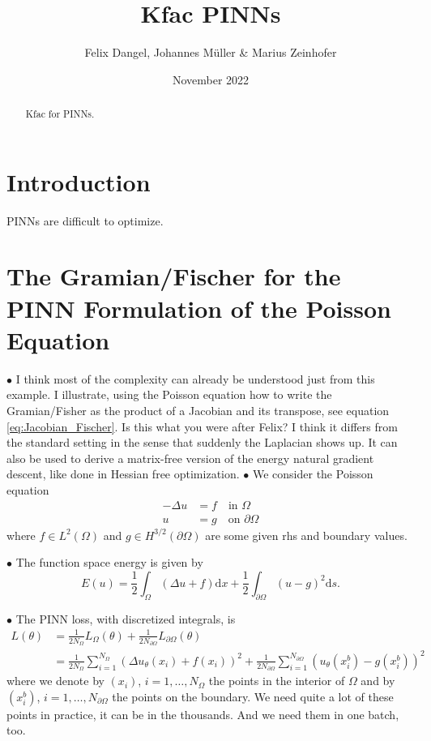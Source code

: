 \documentclass[11pt]{article}
\title{Kfac PINNs }
\date{November 2022}
\author{Felix Dangel, Johannes M\"uller \& Marius Zeinhofer}
\theoremstyle{definition}
\theoremstyle{plain}
\begin{document}
\maketitle

\begin{abstract}
  Kfac for PINNs.
\end{abstract}
\section{Introduction}
PINNs are difficult to optimize.

\section{The Gramian/Fischer for the PINN Formulation of the Poisson Equation}
$\bullet$ I think most of the complexity can already be understood just from this example.
I illustrate, using the Poisson equation how to write the Gramian/Fisher as the product of a Jacobian and its transpose, see equation \eqref{eq:Jacobian_Fischer}.
Is this what you were after Felix?
I think it differs from the standard setting in the sense that suddenly the Laplacian shows up.
It can also be used to derive a matrix-free version of the energy natural gradient descent, like done in Hessian free optimization.
$\bullet$ We consider the Poisson equation
\begin{align*}
  -\Delta u & = f \quad \text{in }\Omega \\
  u & = g \quad \text{on }\partial\Omega
\end{align*}
where $f\in L^2(\Omega)$ and $g\in H^{3/2}(\partial\Omega)$ are some given rhs and boundary values.

$\bullet$ The function space energy is given by
\[ E(u) = \frac{1}{2} \int_\Omega (\Delta u + f) \mathrm dx + \frac12 \int_{\partial\Omega} (u-g)^2 \mathrm ds. \]

$\bullet$ The PINN loss, with discretized integrals, is
\begin{align*}
  L(\theta)
  &=
    \frac{1}{2N_\Omega} L_\Omega(\theta) + \frac{1}{2N_{\partial\Omega}}L_{\partial\Omega}(\theta)
  \\
  &=
    \frac{1}{2N_\Omega} \sum_{i=1}^{N_\Omega} (\Delta u_\theta(x_i) + f(x_i))^2 + \frac{1}{2N_{\partial\Omega}}\sum_{i=1}^{N_{\partial\Omega}} ( u_\theta(x^b_i) - g(x^b_i))^2
\end{align*}
where we denote by $(x_i)$, $i=1,\dots,N_\Omega$ the points in the interior of $\Omega$ and by $(x^b_i)$, $i=1,\dots,N_{\partial\Omega}$ the points on the boundary.
We need quite a lot of these points in practice, it can be in the thousands.
And we need them in one batch, too.
\end{document}
